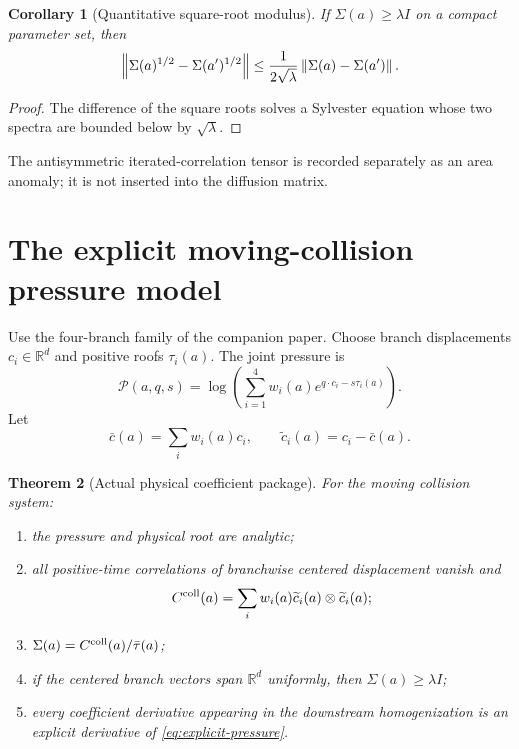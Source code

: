 \documentclass[11pt,reqno]{amsart}
\newtheorem{theorem}{Theorem}[section]
\newtheorem{corollary}[theorem]{Corollary}
\theoremstyle{definition}
\theoremstyle{remark}
\newcommand{\R}{\mathbb R}
\newcommand{\norm}[1]{\left\lVert #1\right\rVert}
\begin{document}
\begin{corollary}[Quantitative square-root modulus]\label{cor:sqrt}
If $\Sigma(a)\ge\lambda I$ on a compact parameter set, then
\[
 \norm{\Sigma(a)^{1/2}-\Sigma(a')^{1/2}}
 \le {1\over2\sqrt\lambda}
 \norm{\Sigma(a)-\Sigma(a')}.
\]
\end{corollary}

\begin{proof}
The difference of the square roots solves a Sylvester equation whose two
spectra are bounded below by $\sqrt\lambda$.
\end{proof}

The antisymmetric iterated-correlation tensor is recorded separately as an
area anomaly; it is not inserted into the diffusion matrix.

\section{The explicit moving-collision pressure model}

Use the four-branch family of the companion paper.  Choose branch
displacements $c_i\in\R^d$ and positive roofs $\tau_i(a)$.  The joint pressure
is
\begin{equation}\label{eq:explicit-pressure}
 \mathscr P(a,q,s)=
 \log\left(\sum_{i=1}^4w_i(a)e^{q\cdot c_i-s\tau_i(a)}\right).
\end{equation}
Let
\[
 \bar c(a)=\sum_iw_i(a)c_i,
 \qquad \widetilde c_i(a)=c_i-\bar c(a).
\]

\begin{theorem}[Actual physical coefficient package]\label{thm:actual}
For the moving collision system:
\begin{enumerate}[label=(\roman*)]
\item the pressure and physical root are analytic;
\item all positive-time correlations of branchwise centered displacement
vanish and
\[
 C^{\rm coll}(a)=\sum_iw_i(a)
 \widetilde c_i(a)\otimes\widetilde c_i(a);
\]
\item $\Sigma(a)=C^{\rm coll}(a)/\bar\tau(a)$;
\item if the centered branch vectors span $\R^d$ uniformly, then
$\Sigma(a)\ge\lambda I$;
\item every coefficient derivative appearing in the downstream
homogenization is an explicit derivative of \eqref{eq:explicit-pressure}.
\end{enumerate}
\end{theorem}
\end{document}
